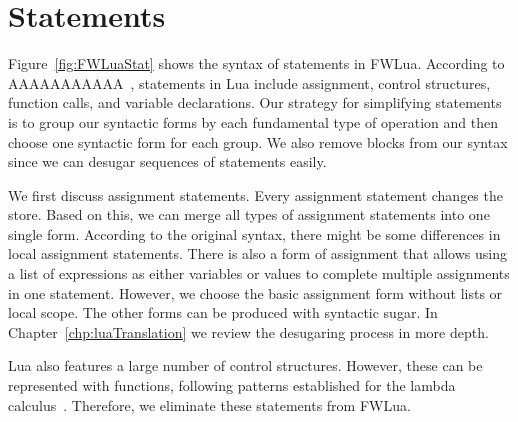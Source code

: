 \section{Statements}
Figure~\ref{fig:FWLuaStat} shows the syntax of statements in FWLua.
According to AAAAAAAAAAA~\cite{PIL},
statements in Lua include assignment, control structures, function calls, and variable declarations.
%
Our strategy for simplifying statements is to group our syntactic forms by each fundamental type of operation and then choose one syntactic form for each group.
We also remove blocks from our syntax since we can desugar sequences of statements easily.

We first discuss assignment statements.
Every assignment statement changes the store. Based on this, we can merge all types of assignment statements into one single form. According to the original syntax, there might be some differences in local assignment statements.  There is also a form of assignment that allows using a list of expressions as either variables or values to complete multiple assignments in one statement. However, we choose the basic assignment form without lists or local scope.  The other forms can be produced with syntactic sugar.
In Chapter~\ref{chp:luaTranslation} we review the desugaring process in more depth.

Lua also features a large number of control structures.
However, these can be represented with functions,
following patterns established for the lambda calculus~\cite{aaa}.
Therefore, we eliminate these statements from FWLua.


